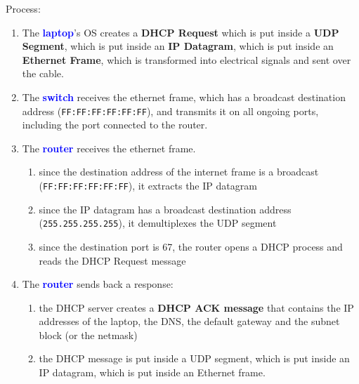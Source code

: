 \documentclass[a4paper]{article}
\begin{document}
Process:
\begin{enumerate}
    \item The \textcolor{blue}{\textbf{laptop}}'s OS creates a \textbf{DHCP Request} which is put inside a \textbf{UDP Segment}, which is put inside an \textbf{IP Datagram}, which is put inside an \textbf{Ethernet Frame}, which is transformed into electrical signals and sent over the cable.
    \item The \textcolor{blue}{\textbf{switch}} receives the ethernet frame, which has a broadcast destination address (\texttt{FF:FF:FF:FF:FF:FF}), and transmits it on all ongoing ports, including the port connected to the router.
    \item The \textcolor{blue}{\textbf{router}} receives the ethernet frame.
    \begin{enumerate}
        \item since the destination address of the internet frame is a broadcast (\texttt{FF:FF:FF:FF:FF:FF}), it extracts the IP datagram
        \item since the IP datagram has a broadcast destination address (\texttt{255.255.255.255}), it demultiplexes the UDP segment
        \item since the destination port is 67, the router opens a DHCP process and reads the DHCP Request message
    \end{enumerate}
    \item The \textcolor{blue}{\textbf{router}} sends back a response:
    \begin{enumerate}
        \item the DHCP server creates a \textbf{DHCP ACK message} that contains the IP addresses of the laptop, the DNS, the default gateway and the subnet block (or the netmask)
        \item the DHCP message is put inside a UDP segment, which is put inside an IP datagram, which is put inside an Ethernet frame.
    \end{enumerate}



\begin{center}
\end{center}
\end{enumerate}
\end{document}
